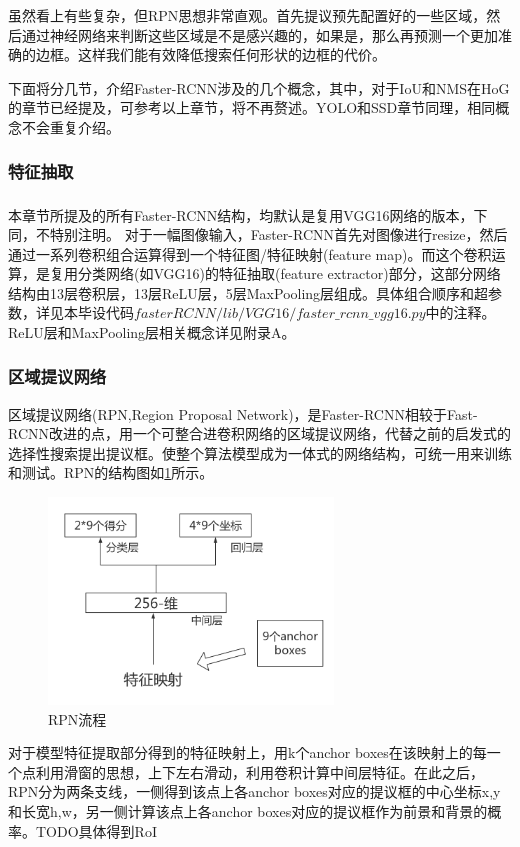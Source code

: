 \documentclass[12pt,a4paper,titlepage]{article}
\newcommand{\upcite}[1]{\textsuperscript{\textsuperscript{\cite{#1}}}}  %
\begin{document}
虽然看上有些复杂，但RPN思想非常直观。首先提议预先配置好的一些区域，然后通过神经网络来判断这些区域是不是感兴趣的，如果是，那么再预测一个更加准确的边框。这样我们能有效降低搜索任何形状的边框的代价。\par
下面将分几节，介绍Faster-RCNN涉及的几个概念，其中，对于IoU和NMS在HoG的章节已经提及，可参考以上章节，将不再赘述。YOLO和SSD章节同理，相同概念不会重复介绍。

\subsubsection{特征抽取}
本章节所提及的所有Faster-RCNN结构，均默认是复用VGG16\upcite{simonyan2014very}网络的版本，下同，不特别注明。
对于一幅图像输入，Faster-RCNN首先对图像进行resize，然后通过一系列卷积组合运算得到一个特征图/特征映射(feature map)。而这个卷积运算，是复用分类网络(如VGG16)的特征抽取(feature extractor)部分，这部分网络结构由13层卷积层，13层ReLU层，5层MaxPooling层组成。具体组合顺序和超参数，详见本毕设代码$fasterRCNN/lib/VGG16/faster\_rcnn\_vgg16.py$中的注释。ReLU层和MaxPooling层相关概念详见附录A。

\subsubsection{区域提议网络}
区域提议网络(RPN,Region Proposal Network)，是Faster-RCNN相较于Fast-RCNN改进的点，用一个可整合进卷积网络的区域提议网络，代替之前的启发式的选择性搜索提出提议框。使整个算法模型成为一体式的网络结构，可统一用来训练和测试。RPN的结构图如\ref{fig:rpn}所示。

\begin{figure}[h]
\centering
\includegraphics[height=5.5cm]{img/rpn.png}
\caption{RPN流程}
\label{fig:rpn}
\end{figure}
\par

对于模型特征提取部分得到的特征映射上，用k个anchor boxes在该映射上的每一个点利用滑窗的思想，上下左右滑动，利用卷积计算中间层特征。在此之后，RPN分为两条支线，一侧得到该点上各anchor boxes对应的提议框的中心坐标x,y和长宽h,w，另一侧计算该点上各anchor boxes对应的提议框作为前景和背景的概率。TODO具体得到RoI
\end{document}
